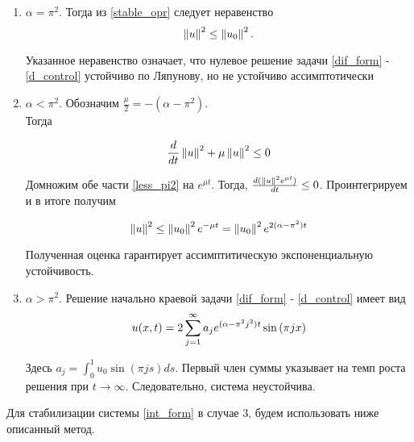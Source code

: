 \begin{enumerate}
    \item $\alpha = \pi^2$. Тогда из \eqref{stable_opr} следует неравенство
        \begin{equation}
            \left\lVert u\right\rVert^2 \le \left\lVert u_0\right\rVert^2.
        \end{equation}
        
        Указанное неравенство означает, что нулевое решение задачи
        \eqref{dif_form} - \eqref{d_control} устойчиво по Ляпунову, но не устойчиво ассимптотически
    
    \item $\alpha < \pi^2$. Обозначим $\frac{\mu}{2} = -(\alpha - \pi^2)$.\\
        
        Тогда

        \begin{equation}\label{less_pi2}
            \frac{d}{dt}\left\lVert u\right\rVert^2 + \mu \left\lVert u\right\rVert^2 \le 0
        \end{equation}

        Домножим обе части \eqref{less_pi2} на $e^{\mu t}$. Тогда, 
        $\frac{d(\left\lVert u\right\rVert^2 e^{\mu t})}{dt} \le 0$. Проинтегрируем и в итоге получим

        \begin{equation*}
            \left\lVert u\right\rVert^2 \le \left\lVert u_0\right\rVert^2 e^{-\mu t} = \left\lVert u_0\right\rVert^2 e^{2(\alpha - \pi^2) t}
        \end{equation*}

        Полученная оценка гарантирует ассимптитическую экспоненциальную устойчивость.

    \item $\alpha > \pi^2$. Решение начально краевой задачи \eqref{dif_form} - \eqref{d_control} имеет вид
        \begin{equation}
            u(x, t) = 2 \sum \limits_{j=1}^{\infty}{a_j e^{(\alpha - \pi^2 j^2)t}\sin{(\pi j x)}}
        \end{equation}

        Здесь $a_j = \int_0^1{u_0 \sin{(\pi j s)} ds}$. Первый член суммы указывает на темп роста решения при $t \rightarrow \infty$. Следовательно, система неустойчива.
\end{enumerate}

Для стабилизации системы \eqref{int_form} в случае 3, будем использовать ниже описанный метод.
